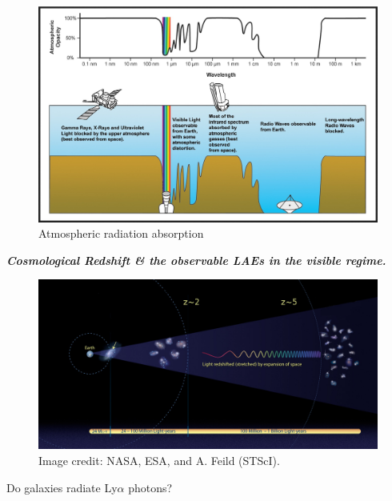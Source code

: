 \documentclass{beamer}
\begin{document}
\begin{frame}
\begin{figure}
\includegraphics[scale=0.8]{Figures/AtmosphericEM.jpg}
\caption*{Atmospheric radiation absorption}
\end{figure}
\end{frame}



\begin{frame}{\textit{\textbf{Cosmological Redshift \& the observable LAEs in the visible regime.}}}
\begin{figure}
\includegraphics[scale=0.3]{Figures/expansion.jpg}
\caption*{Image credit: NASA, ESA, and A. Feild (STScI).}
\end{figure}
\end{frame}

\begin{frame}
\begin{center}
\LARGE{Do galaxies radiate Ly$\alpha$ photons?}
\end{center}
\end{frame}
\end{document}

